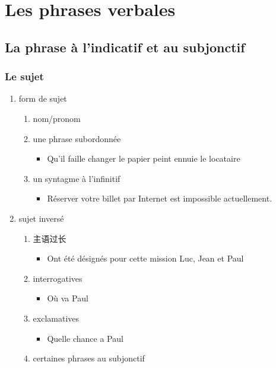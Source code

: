 \documentclass[UTF8]{report}
\begin{document}
\section{Les phrases verbales}
\subsection{La phrase à l’indicatif et au subjonctif}
\subsubsection{Le sujet}
\begin{enumerate}
    \item form de sujet
    \begin{enumerate}
        \item nom/pronom
        \item une phrase subordonnée
        \begin{itemize}
            \item Qu’il faille changer le papier peint ennuie le locataire
        \end{itemize}
        \item un syntagme à l’infinitif
        \begin{itemize}
            \item Réserver votre billet par Internet est impossible actuellement.
        \end{itemize}
    \end{enumerate}
    \item sujet inversé
    \begin{enumerate}
        \item 主语过长
        \begin{itemize}
            \item Ont été désignés pour cette mission Luc, Jean et Paul
        \end{itemize}
        \item interrogatives
        \begin{itemize}
            \item Où va Paul
        \end{itemize}
        \item exclamatives
        \begin{itemize}
            \item Quelle chance a Paul
        \end{itemize}
        \item certaines phrases au subjonctif
        \begin{itemize}

\end{itemize}
\end{enumerate}
\end{enumerate}
\end{document}
